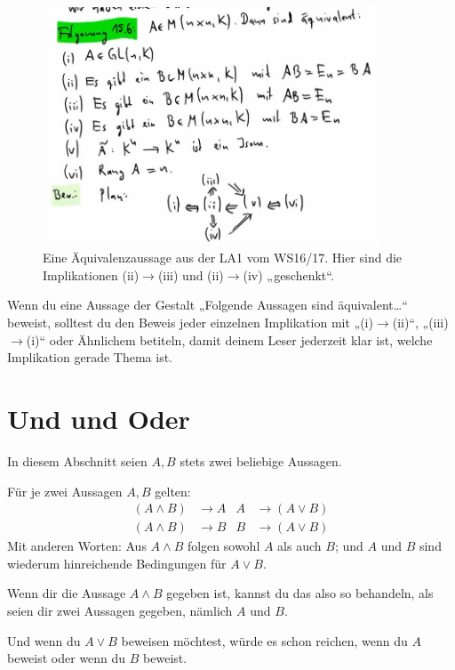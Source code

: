 \begin{bem}
\begin{figure}[ht]
        \includegraphics[width=10cm]{./_img/equivbeweis.jpeg}
        \centering \caption{Eine Äquivalenzaussage aus der LA1 vom WS16/17. Hier sind die Implikationen (ii)$\to$(iii) und (ii)$\to$(iv) „geschenkt“.}
    \end{figure}
\end{bem}


\begin{bem}
    Wenn du eine Aussage der Gestalt „Folgende Aussagen sind äquivalent\dots“ beweist, solltest du den Beweis jeder einzelnen Implikation mit „(i)$\to$(ii)“, „(iii)$\to$(i)“ oder Ähnlichem betiteln, damit deinem Leser jederzeit klar ist, welche Implikation gerade Thema ist.
\end{bem}





\section{Und und Oder}


In diesem Abschnitt seien $A,B$ stets zwei beliebige Aussagen.


\begin{axiom}[*]\label{undoderaxiome}
    Für je zwei Aussagen $A,B$ gelten:
    \begin{align*}
        (A\land B) & \to A & A & \to (A\lor B) \\
        (A\land B) & \to B & B & \to (A\lor B)
    \end{align*}
    Mit anderen Worten: Aus $A\land B$ folgen sowohl $A$ als auch $B$; und $A$ und $B$ sind wiederum hinreichende Bedingungen für $A\lor B$.
\end{axiom}


\begin{bem}
    Wenn dir die Aussage $A\land B$ gegeben ist, kannst du das also so behandeln, als seien dir zwei Aussagen gegeben, nämlich $A$ und $B$.
    
    Und wenn du $A\lor B$ beweisen möchtest, würde es schon reichen, wenn du $A$ beweist oder wenn du $B$ beweist.
\end{bem}


